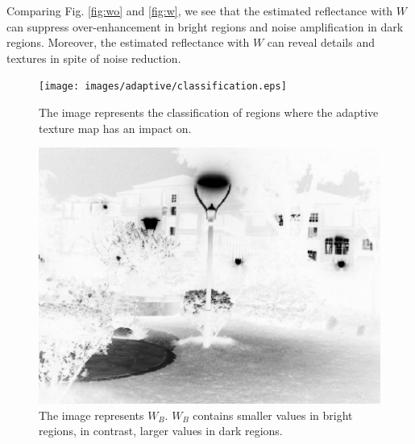 Comparing Fig. \ref{fig:wo} and \ref{fig:w}, we see that the estimated reflectance with $W$ can suppress over-enhancement in bright regions and noise amplification in dark regions. Moreover, the estimated reflectance with $W$ can reveal details and textures in spite of noise reduction. 
\begin{figure}[tb]
	\centering
	\texttt{[image: images/adaptive/classification.eps]}
	\caption{The image represents the classification of regions where the adaptive texture map has an impact on.} \label{fig:adaptive/classification}
\end{figure}
\begin{figure}[tb]
	\centering
	\includegraphics[width=0.5\hsize]{images/adaptive/wb.eps}
	\caption{The image represents $W_{B}$. $W_{B}$ contains smaller values in bright regions, in contrast, larger values in dark regions.} \label{fig:adaptive/wb}
\end{figure}
